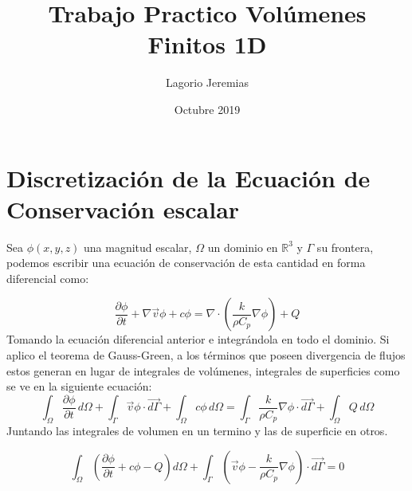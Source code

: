 \documentclass{article}
\title{Trabajo Practico Volúmenes Finitos 1D}
\author{Lagorio Jeremias }
\date{ Octubre 2019}
\begin{document}
\maketitle

\section{Discretización de la Ecuación de Conservación escalar }

    Sea $\phi(x,y,z)$ una magnitud escalar, $\Omega$ un dominio en $\mathbb{R}^3$ y $\Gamma$ su frontera, podemos escribir una ecuación de conservación de esta cantidad en forma diferencial como: 

    \begin{equation}
        \dfrac {{ \partial \phi}} {{ \partial t}} + \nabla \vec{v}\phi+c\phi = \nabla \cdot \left( \frac{k}{\rho C_p} \nabla \phi \right) + Q
        \end{equation}
    Tomando la ecuación diferencial anterior e integrándola en todo el dominio. Si aplico el teorema de Gauss-Green, a los términos que poseen divergencia de flujos estos generan en lugar de integrales de volúmenes, integrales de superficies como se ve en la siguiente ecuación:
    \begin{equation}
       \int_{\Omega} \dfrac { \partial \phi} { \partial t} \, d\Omega + \int_{\Gamma} \vec{v}\phi \cdot \vec{d\Gamma} + \int_{\Omega} c \phi \, d\Omega = \int_{\Gamma}  \frac{k}{\rho C_p} \nabla \phi \cdot \vec{d\Gamma} + \int_{\Omega} Q \, d\Omega
    \end{equation}
    Juntando las integrales de volumen en un termino y las de superficie en otros.\
    
   \begin{equation}
       \int_{\Omega} \left( \dfrac {{ \partial \phi}} {{ \partial t}} + c \phi - Q \right) d\Omega + \int_{\Gamma} \left( \vec{v}\phi - \frac{k}{\rho C_p} \nabla \phi \right) \cdot \vec{d\Gamma} = 0
   \end{equation} 
   
\end{document}
